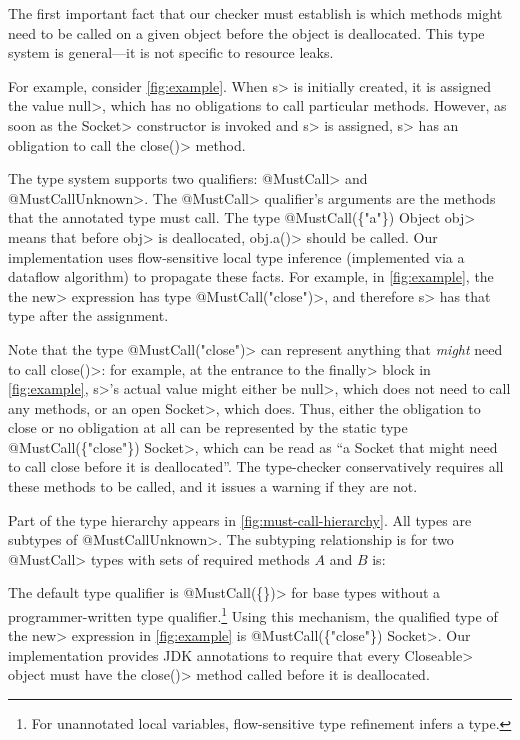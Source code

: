 The first important fact that our checker must establish
is which methods might need to be called on
a given object before the object is deallocated.
This type system is general---it is not specific
to resource leaks.

For example, consider \cref{fig:example}. When \<s> is initially
created, it is assigned the value \<null>, which has no obligations
to call particular methods. However, as soon as the \<Socket> constructor
is invoked and \<s> is assigned, \<s> has an obligation to call the
\<close()> method.


The type system supports two qualifiers: \<@MustCall> and
\<@MustCallUnknown>. The \<@MustCall> qualifier's arguments are the
methods that the annotated type must call. The type
\<@MustCall(\{"a"\}) Object obj> means that before \<obj> is
deallocated, \<obj.a()> should be called. Our implementation
uses flow-sensitive local type inference (implemented via a dataflow algorithm)
to propagate these facts. For example, in \cref{fig:example}, the
the \<new> expression has type \<@MustCall("close")>, and therefore
\<s> has that type after the assignment.

Note that the type \<@MustCall("close")>
can represent anything that \emph{might} need to
call \<close()>: for example, at the entrance to
the \<finally> block in \cref{fig:example}, \<s>'s
actual value might either be \<null>, which does not
need to call any methods, or an open \<Socket>, which does.
Thus, either the obligation to close or no obligation at all
can be represented by the static
type \<@MustCall(\{"close"\}) Socket>, which can be read as ``a
Socket that might need to call close before it is deallocated''.
The type-checker conservatively requires all these methods to be called,
and it issues a warning if they are not.

Part of the type hierarchy appears in \cref{fig:must-call-hierarchy}.
All types are subtypes of \<@MustCallUnknown>.
The subtyping relationship is for two \<@MustCall> types with sets
of required methods $A$ and $B$ is:

The default type qualifier is \<@MustCall(\{\})> for base types without a
programmer-written type qualifier.\footnote{For unannotated local variables,
  flow-sensitive type refinement infers a type.}
Using this mechanism, the qualified type of the \<new> expression
in \cref{fig:example}
is \<@MustCall(\{"close"\}) Socket>. Our implementation
provides JDK annotations to require that every 
\<Closeable> object must have the \<close()> method called before
it is deallocated.

